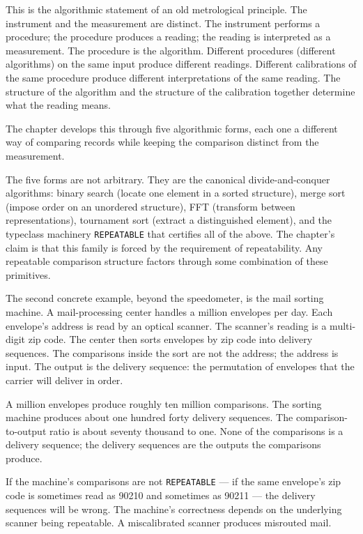 \begin{chapteressay}
This is the algorithmic statement of an old metrological principle.
The instrument and the measurement are distinct. The instrument
performs a procedure; the procedure produces a reading; the reading
is interpreted as a measurement. The procedure is the algorithm.
Different procedures (different algorithms) on the same input
produce different readings. Different calibrations of the same
procedure produce different interpretations of the same reading.
The structure of the algorithm and the structure of the calibration
together determine what the reading means.

The chapter develops this through five algorithmic forms, each one a
different way of comparing records while keeping the comparison
distinct from the measurement.

The five forms are not arbitrary. They are the canonical
divide-and-conquer algorithms: binary search (locate one element in
a sorted structure), merge sort (impose order on an unordered
structure), FFT (transform between representations), tournament sort
(extract a distinguished element), and the typeclass machinery
\texttt{REPEATABLE} that certifies all of the above. The chapter's
claim is that this family is forced by the requirement of
repeatability. Any repeatable comparison structure factors through
some combination of these primitives.

The second concrete example, beyond the speedometer, is the mail
sorting machine. A mail-processing center handles a million envelopes
per day. Each envelope's address is read by an optical scanner. The
scanner's reading is a multi-digit zip code. The center then sorts
envelopes by zip code into delivery sequences. The comparisons inside
the sort are not the address; the address is input. The output is
the delivery sequence: the permutation of envelopes that the carrier
will deliver in order.

A million envelopes produce roughly ten million comparisons. The
sorting machine produces about one hundred forty delivery sequences.
The comparison-to-output ratio is about seventy thousand to one. None
of the comparisons is a delivery sequence; the delivery sequences are
the outputs the comparisons produce.

If the machine's comparisons are not \texttt{REPEATABLE} --- if the
same envelope's zip code is sometimes read as 90210 and sometimes as
90211 --- the delivery sequences will be wrong. The machine's
correctness depends on the underlying scanner being repeatable. A
miscalibrated scanner produces misrouted mail.


\end{chapteressay}
